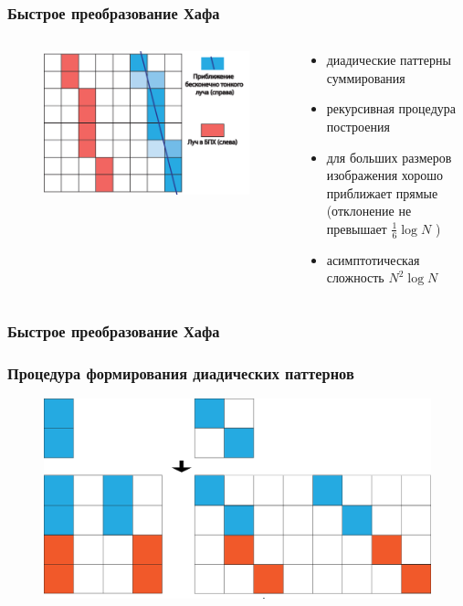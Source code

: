 \documentclass[12pt]{beamer}
\begin{document}
\begin{frame}
\frametitle{Быстрое преобразование Хафа}
\begin{columns}[T,onlytextwidth]
  \hspace*{-0.5cm}
  \begin{column}{0.65\textwidth}
  \begin{figure}
    \includegraphics[width=1\textwidth]{fht}
  \end{figure}
  \end{column}
  \begin{column}{0.45\textwidth}
  \begin{itemize}
    \item диадические паттерны суммирования
    \item рекурсивная процедура построения
    \item для больших размеров изображения хорошо приближает прямые (отклонение не превышает  $\frac 1 6 \log N$ \cite{ershov2015dyadic})
    \item асимптотическая сложность $N^2 \log N$
  \end{itemize}
  \end{column}
\end{columns}

\end{frame}

\begin{frame}
\frametitle{Быстрое преобразование Хафа}
\frametitle{Процедура формирования диадических паттернов}
  \begin{figure}
  \centering
    \includegraphics[width=1\textwidth]{../Dissertation/images/part1_img/hough_proc}
  \end{figure}
\end{frame}
\end{document}
